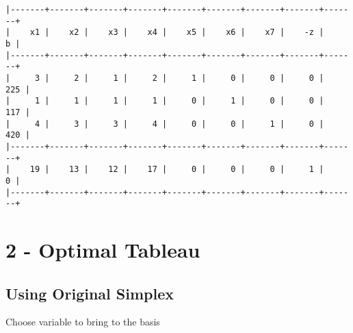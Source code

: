 \documentclass[
  letterpaper,
  DIV=11,
  numbers=noendperiod]{scrartcl}
\begin{document}
\begin{verbatim}
|-------+-------+-------+-------+-------+-------+-------+-------+-------+
|    x1 |    x2 |    x3 |    x4 |    x5 |    x6 |    x7 |    -z |     b |
|-------+-------+-------+-------+-------+-------+-------+-------+-------+
|     3 |     2 |     1 |     2 |     1 |     0 |     0 |     0 |   225 |
|     1 |     1 |     1 |     1 |     0 |     1 |     0 |     0 |   117 |
|     4 |     3 |     3 |     4 |     0 |     0 |     1 |     0 |   420 |
|-------+-------+-------+-------+-------+-------+-------+-------+-------+
|    19 |    13 |    12 |    17 |     0 |     0 |     0 |     1 |     0 |
|-------+-------+-------+-------+-------+-------+-------+-------+-------+
\end{verbatim}

\newpage

\section{2 - Optimal Tableau}\label{optimal-tableau}

\subsection{Using Original Simplex}\label{using-original-simplex}

Choose variable to bring to the basis
\end{document}
